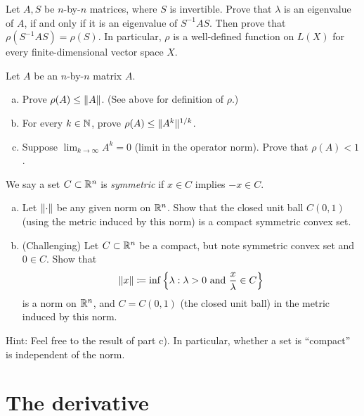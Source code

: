 \begin{exercise}
Let $A,S$ be $n$-by-$n$ matrices, where $S$ is invertible.
Prove that $\lambda$ is an eigenvalue of $A$, if and only
if it is an eigenvalue of $S^{-1}AS$.  Then prove that
$\rho(S^{-1}AS) = \rho(S)$.
In particular, $\rho$ is a well-defined function on $L(X)$ for
every finite-dimensional vector space $X$.
\end{exercise}

\begin{exercise}
\pagebreak[2]
Let $A$ be an $n$-by-$n$ matrix $A$.
\begin{enumerate}[a)]
\item
Prove $\rho(A) \leq \lVert {A} \rVert$.  (See above for definition of $\rho$.)
\item
For every $k \in {\mathbb{N}}$, prove
$\rho(A) \leq \lVert {A^k} \rVert^{1/k}$.
\item
Suppose $\displaystyle \lim_{k\to\infty} A^k = 0$ (limit in the operator norm).
Prove that $\rho(A) < 1$.
\end{enumerate}
\end{exercise}

\begin{exercise}
We say a set $C \subset {\mathbb{R}}^n$ is \emph{symmetric} if
$x \in C$ implies $-x \in C$.
\begin{enumerate}[a)]
\item
Let $\lVert {\cdot} \rVert$ be any given norm on ${\mathbb{R}}^n$.  Show that the closed unit ball
$C(0,1)$ (using the metric induced by this norm)
is a compact symmetric convex set.
\item (Challenging)
Let $C \subset {\mathbb{R}}^n$ be a compact,
but note symmetric convex set and $0 \in C$.  Show that
\begin{equation*}
\lVert {x} \rVert \coloneqq \inf \left\{ \lambda : \lambda > 0 \text{ and } \frac{x}{\lambda} \in C \right\}
\end{equation*}
is a norm on ${\mathbb{R}}^n$, and $C = C(0,1)$ (the closed unit ball) in the metric induced by this norm.
\end{enumerate}
Hint: Feel free to the result of 
part c).  In particular, whether a set is ``compact'' is independent of the
norm.
\end{exercise}


\sectionnewpage
\section{The derivative}
\label{sec:svtheder}

